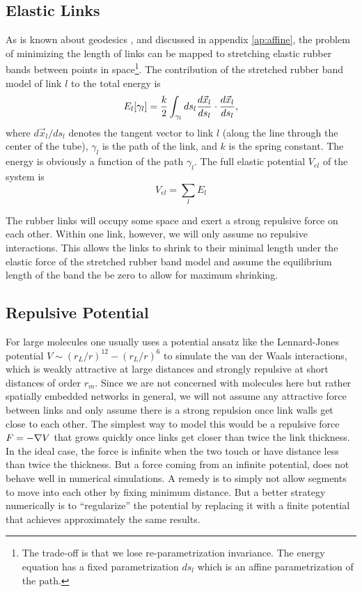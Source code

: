 \documentclass[endfloats,nofootinbib,preprint,floatfix,titlepage,superscriptaddress]{revtex4} %
\begin{document}
\subsection{Elastic Links}
As is known about geodesics \citep{novikov1984}, and discussed in appendix \ref{ap:affine}, the problem of minimizing the length of links can be mapped to stretching elastic rubber bands between points in space\footnote{The trade-off is that we lose re-parametrization invariance. The energy equation has a fixed parametrization $ds_l$ which is an affine parametrization of the path.}. The contribution of the stretched rubber band model of link $l$ to the total energy is
\begin{equation}
  E_l[\gamma_l] = {k\over 2}\int_{\gamma_l} ds_l {d\vec{x}_l\over ds_l} \cdot {d\vec{x}_l\over ds_l}, \label{eq:El}
\end{equation}
where $d\vec{x}_l/ds_l$ denotes the tangent vector to link $l$ (along the line through the center of the tube), $\gamma_l$ is the path of the link, and $k$ is the spring constant. 
The energy is obviously a function of the path $\gamma_l$. 
The full elastic potential $V_{el}$ of the system is
\begin{equation}
    V_{el} = \sum_l E_l
\end{equation}

The rubber links will occupy some space and exert a strong repulsive force on each other. Within one link, however, we will only assume no repulsive interactions. This allows the links to shrink to their minimal length under the elastic force of the stretched rubber band model and assume the equilibrium length of the band the be zero to allow for maximum shrinking. 

\subsection{Repulsive Potential\label{ap:repel}}

For large molecules one usually uses a potential ansatz like the Lennard-Jones potential $V \sim (r_L/r)^{12} - (r_L/r)^6 $ to simulate the van der Waals interactions, which is weakly attractive at large distances and strongly repulsive at short distances of order $r_m$. Since we are not concerned with molecules here but rather spatially embedded networks in general, we will not assume any attractive force between links and only assume there is a strong repulsion once link walls get close to each other. The simplest way to model this would be a repulsive force $F = -\nabla V$ that grows quickly once links get closer than twice the link thickness. In the ideal case, the force is infinite when the two touch or have distance less than twice the thickness. But a force coming from an infinite potential, does not behave well in numerical simulations. A remedy is to simply not allow segments to move into each other by fixing minimum distance. But a better strategy numerically is to ``regularize'' the potential by replacing it with a finite potential that achieves approximately the same results. 
\end{document}
